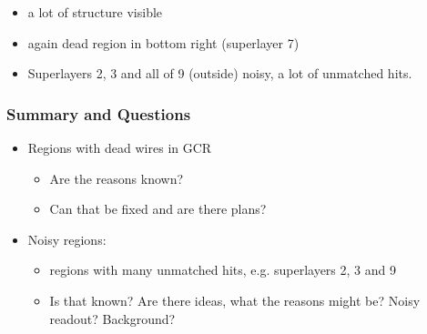 \documentclass[18pt]{beamer}
\begin{document}
\begin{frame}
\begin{columns}
\begin{column}{0.5\textwidth}
    \end{column}
  \end{columns}
  \begin{itemize}
  \item a lot of structure visible
  \item again dead region in bottom right (superlayer 7)
  \item Superlayers 2, 3 and all of 9 (outside) noisy, a lot of unmatched hits. 
  \end{itemize}
\end{frame}

\begin{frame}
  \frametitle{Summary and Questions}\label{lastbeforebackup}
  \begin{itemize}
  \item Regions with dead wires in GCR
    \begin{itemize}
    \item Are the reasons known?
    \item Can that be fixed and are there plans?
    \end{itemize}
  \item Noisy regions:
    \begin{itemize}
    \item regions with many unmatched hits, e.g. superlayers 2, 3 and 9
    \item Is that known? Are there ideas, what the reasons might be? Noisy readout? Background?
    \end{itemize}
  \end{itemize}
\end{frame}



\end{document}
